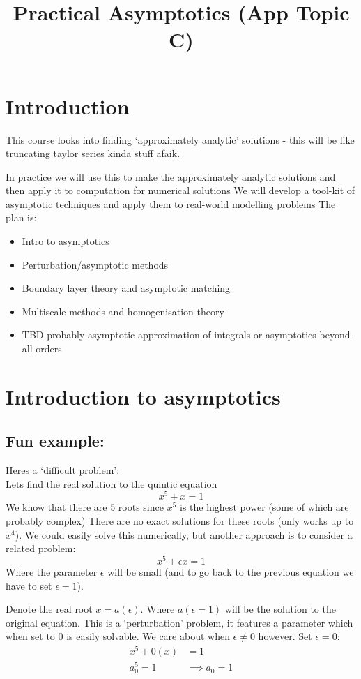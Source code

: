 \documentclass{/home/janmebows/Documents/LatexTemplates/myassignment}
\title{Practical Asymptotics (App Topic C)}
\begin{document}
\maketitle




\section{Introduction}
This course looks into finding `approximately analytic' solutions - this will be like truncating taylor series kinda stuff afaik.

In practice we will use this to make the approximately analytic solutions and then apply it to computation for numerical solutions
We will develop a tool-kit of asymptotic techniques and apply them to real-world modelling problems
The plan is:
\begin{itemize}
    \item Intro to asymptotics
    \item Perturbation/asymptotic methods
    \item Boundary layer theory and asymptotic matching
    \item Multiscale methods and homogenisation theory
    \item TBD probably asymptotic approximation of integrals or asymptotics beyond-all-orders
\end{itemize}

\section{Introduction to asymptotics}
\subsection{Fun example:}
Heres a `difficult problem':\\
Lets find the real solution to the quintic equation
\[x^5 + x =1\]
We know that there are 5 roots since $x^5$ is the highest power (some of which are probably complex)
There are no exact solutions for these roots (only works up to $x^4$).
We could easily solve this numerically, but another approach is to consider a related problem:\\
\[x^5 + \epsilon x = 1\]
Where the parameter $\epsilon$ will be small (and to go back to the previous equation we have to set $\epsilon=1$).

Denote the real root $x=a(\epsilon)$. Where $a(\epsilon=1)$ will be the solution to the original equation.  This is a `perturbation' problem, it features a parameter which when set to $0$ is easily solvable. We care about when $\epsilon\neq 0$ however.
Set $\epsilon=0$:
\begin{align*}
    x^5 + 0(x) &= 1\\
    a_0^5 = 1 &\implies a_0 = 1\\
\end{align*}
\end{document}
